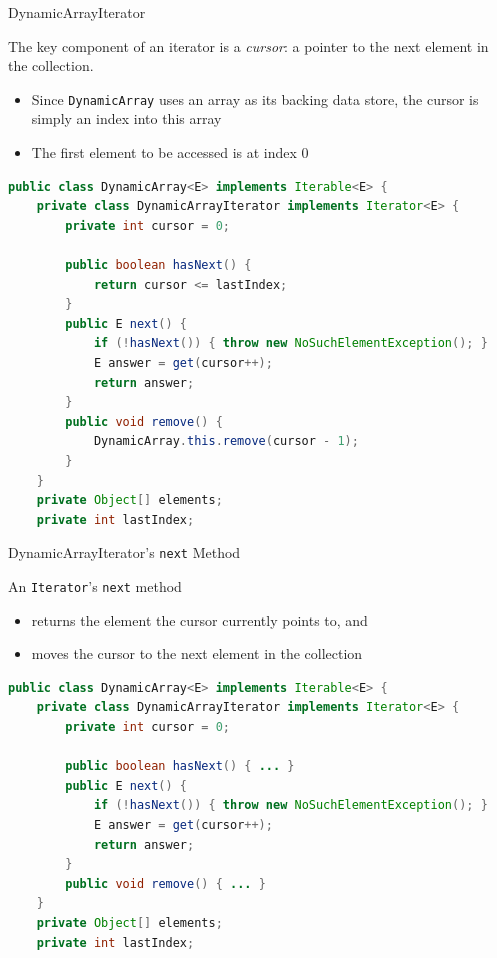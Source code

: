 \documentclass{beamer}
\begin{document}
\begin{frame}[fragile]{DynamicArrayIterator}

The key component of an iterator is a {\it cursor}: a pointer to the next element in the collection.

\begin{itemize}
\item Since {\tt DynamicArray} uses an array as its backing data store, the cursor is simply an index into this array
\item The first element to be accessed is at index 0
\end{itemize}

\begin{lstlisting}[language=Java]
public class DynamicArray<E> implements Iterable<E> {
    private class DynamicArrayIterator implements Iterator<E> {
        private int cursor = 0;

        public boolean hasNext() {
            return cursor <= lastIndex;
        }
        public E next() {
            if (!hasNext()) { throw new NoSuchElementException(); }
            E answer = get(cursor++);
            return answer;
        }
        public void remove() {
            DynamicArray.this.remove(cursor - 1);
        }
    }
    private Object[] elements;
    private int lastIndex;
\end{lstlisting}

\end{frame}

\begin{frame}[fragile]{DynamicArrayIterator's {\tt next} Method}

An {\tt Iterator}'s {\tt next} method

\begin{itemize}
\item returns the element the cursor currently points to, and
\item moves the cursor to the next element in the collection
\end{itemize}

\begin{lstlisting}[language=Java]
public class DynamicArray<E> implements Iterable<E> {
    private class DynamicArrayIterator implements Iterator<E> {
        private int cursor = 0;

        public boolean hasNext() { ... }
        public E next() {
            if (!hasNext()) { throw new NoSuchElementException(); }
            E answer = get(cursor++);
            return answer;
        }
        public void remove() { ... }
    }
    private Object[] elements;
    private int lastIndex;
\end{lstlisting}

\end{frame}
\end{document}
